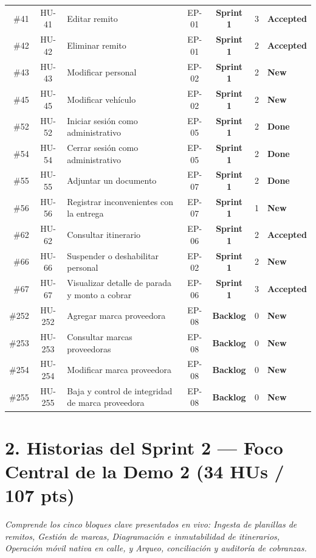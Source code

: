 \documentclass[a4paper,9pt]{article}
\begin{document}
\begin{longtable}{r c p{8.2cm} c c c l}
\#41 & HU-41 & Editar remito & EP-01 & \textbf{Sprint 1} & 3 & \textcolor{tealstatus}{\textbf{Accepted}} \\
\#42 & HU-42 & Eliminar remito & EP-01 & \textbf{Sprint 1} & 2 & \textcolor{tealstatus}{\textbf{Accepted}} \\
\#43 & HU-43 & Modificar personal & EP-02 & \textbf{Sprint 1} & 2 & \textcolor{bluestatus}{\textbf{New}} \\
\#45 & HU-45 & Modificar vehículo & EP-02 & \textbf{Sprint 1} & 2 & \textcolor{bluestatus}{\textbf{New}} \\
\#52 & HU-52 & Iniciar sesión como administrativo & EP-05 & \textbf{Sprint 1} & 2 & \textcolor{slatestatus}{\textbf{Done}} \\
\#54 & HU-54 & Cerrar sesión como administrativo & EP-05 & \textbf{Sprint 1} & 2 & \textcolor{slatestatus}{\textbf{Done}} \\
\#55 & HU-55 & Adjuntar un documento & EP-07 & \textbf{Sprint 1} & 2 & \textcolor{slatestatus}{\textbf{Done}} \\
\#56 & HU-56 & Registrar inconvenientes con la entrega & EP-07 & \textbf{Sprint 1} & 1 & \textcolor{bluestatus}{\textbf{New}} \\
\#62 & HU-62 & Consultar itinerario & EP-06 & \textbf{Sprint 1} & 2 & \textcolor{tealstatus}{\textbf{Accepted}} \\
\#66 & HU-66 & Suspender o deshabilitar personal & EP-02 & \textbf{Sprint 1} & 2 & \textcolor{bluestatus}{\textbf{New}} \\
\#67 & HU-67 & Visualizar detalle de parada y monto a cobrar & EP-06 & \textbf{Sprint 1} & 3 & \textcolor{tealstatus}{\textbf{Accepted}} \\
\#252 & HU-252 & Agregar marca proveedora & EP-08 & \textbf{Backlog} & 0 & \textcolor{bluestatus}{\textbf{New}} \\
\#253 & HU-253 & Consultar marcas proveedoras & EP-08 & \textbf{Backlog} & 0 & \textcolor{bluestatus}{\textbf{New}} \\
\#254 & HU-254 & Modificar marca proveedora & EP-08 & \textbf{Backlog} & 0 & \textcolor{bluestatus}{\textbf{New}} \\
\#255 & HU-255 & Baja y control de integridad de marca proveedora & EP-08 & \textbf{Backlog} & 0 & \textcolor{bluestatus}{\textbf{New}} \\
\end{longtable}
\normalsize

\vspace{6pt}

\section{2. Historias del Sprint 2 — Foco Central de la Demo 2 (34 HUs / 107 pts)}
\noindent\textit{Comprende los cinco bloques clave presentados en vivo: Ingesta de planillas de remitos, Gestión de marcas, Diagramación e inmutabilidad de itinerarios, Operación móvil nativa en calle, y Arqueo, conciliación y auditoría de cobranzas.}
\vspace{4pt}
\end{document}
